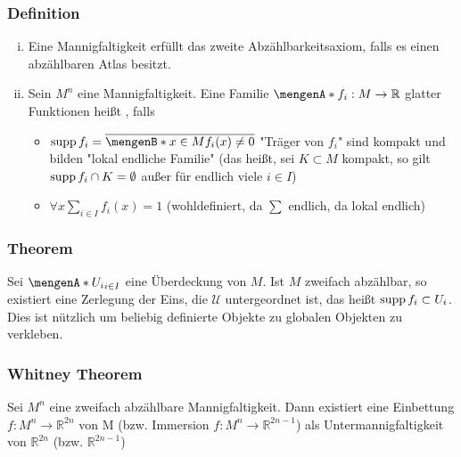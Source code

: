 \subsubsection[Definition: Zerlegung der Eins]{Definition}
\label{ssub:121}
\begin{enumerate}[(i)]
	\item Eine Mannigfaltigkeit erfüllt das zweite Abzählbarkeitsaxiom, falls es einen abzählbaren Atlas besitzt.
	\item Sein $M^n$ eine Mannigfaltigkeit. Eine Familie $\set{f_i:M\to \mathds{R}}$ glatter Funktionen heißt , falls
	\begin{itemize}
		\item $\supp f_i = \overline{\set[x\in M]{f_i(x) \neq 0}}$ "Träger von $f_i$" sind kompakt und bilden "lokal endliche Familie" (das heißt, sei $K\subset M$ kompakt, so gilt $\operatorname{supp} f_i \cap K = \emptyset$ außer für endlich viele $i\in I$)
		\item $\forall x \sum_{i\in I} f_i(x) = 1$ (wohldefiniert, da $\sum$ endlich, da lokal endlich)
	\end{itemize}
\end{enumerate}

\subsubsection[Existenz einer untergeordneten Zerlegung der Eins für zweifach abzählbare Mfkt.]{Theorem}
\label{ssub:122}
Sei $\set{U_i}_{i\in I}$ eine Überdeckung von $M$. Ist $M$ zweifach abzählbar, so existiert eine Zerlegung der Eins, die $\mathcal{U}$ untergeordnet ist, das heißt $\operatorname{supp} f_i \subset U_i$. Dies ist nützlich um beliebig definierte Objekte zu globalen Objekten zu verkleben.

\subsubsection{Whitney Theorem}
\label{ssub:123}
Sei $M^n$ eine zweifach abzählbare Mannigfaltigkeit. Dann existiert eine Einbettung $f:M^n\to \mathds{R}^{2n}$ von M (bzw. Immersion $f:M^n\to \mathds{R}^{2n-1}$) als Untermannigfaltigkeit von $\mathds{R}^{2n}$ (bzw. $\mathds{R}^{2n-1}$)

